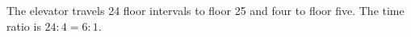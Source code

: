 The elevator travels 24 floor intervals to floor 25 and four to floor five. The time ratio is $24:4=\boxed{6:1}$.
